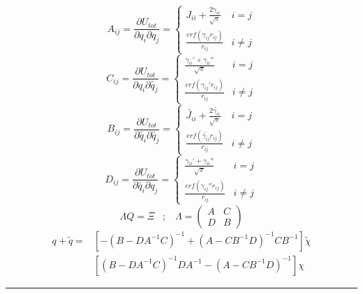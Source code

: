 \documentclass[12pt,english]{article}
\begin{document}
	\newline
	\begin{equation}
		A_{ij}=\frac{\partial U_{tot}}{\partial q_i \partial q_j} = 
		\begin{cases}
			J_{ii}+\frac{2\gamma_{ii}}{\sqrt{\pi}} & i =j\\
			\frac{erf(\gamma_{ij}r_{ij})}{r_{ij}} & i \neq j
		\end{cases}
	\end{equation}
	\begin{equation}
		C_{ij}=\frac{\partial U_{tot}}{\partial q_i \partial \tilde{q_j}} =
		\begin{cases}
			\frac{\gamma_{ii}'+\gamma_{ii}''}{\sqrt{\pi}} & i=j \\
			\frac{erf(\gamma_{ij}'r_{ij})}{r_{ij}} & i\neq j
		\end{cases}
	\end{equation}
	\begin{equation}
		B_{ij}=\frac{\partial U_{tot}}{\partial \tilde{q_i} \partial \tilde{q_j}} =
		\begin{cases}
			\tilde{J_{ii}}+\frac{2\tilde{\gamma_{ii}}}{\sqrt{\pi}} & i=j\\
			\frac{erf(\tilde{\gamma_{ij}}r_{ij})}{r_{ij}} & i \neq j
		\end{cases}
	\end{equation}
	\begin{equation}
		D_{ij}=\frac{\partial U_{tot}}{\partial \tilde{q_i} \partial q_j} = 
		\begin{cases}
			\frac{\gamma_{ii}'+\gamma_{ii}''}{\sqrt{\pi}} & i=j \\
			\frac{erf(\gamma_{ij}''r_{ij})}{r_{ij}} & i\neq j
		\end{cases}
	\end{equation}
	\begin{equation}
		\Lambda Q = \Xi \hspace{10pt} ; \hspace{10pt}  \Lambda =
	\begin{pmatrix}
		A & C \\
		D & B
	\end{pmatrix}
	\end{equation}	
	\begin{equation}
		\begin{split}
			q+\tilde{q} = &[-(B-DA^{-1}C)^{-1}+(A-CB^{-1}D)^{-1}CB^{-1}]\tilde{\chi} \\
						  &[(B-DA^{-1}C)^{-1}DA^{-1} - (A-CB^{-1}D)^{-1}]\chi 
		\end{split}
	\end{equation}
	\rule{450pt}{0.5pt}
\end{document}
